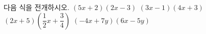 다음 식을 전개하시오.
 $(5x+2)(2x-3)$
 $(3x-1)(4x+3)$
 $(2x+5)\left(\dfrac{1}{2}x+\dfrac{3}{4}\right)$
 $(-4x+7y)(6x-5y)$
